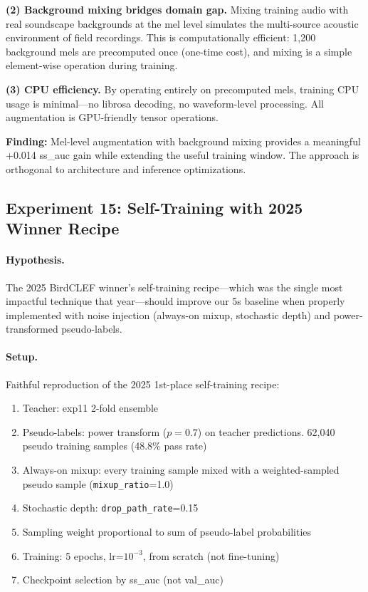\textbf{(2) Background mixing bridges domain gap.}
Mixing training audio with real soundscape backgrounds at the mel level
simulates the multi-source acoustic environment of field recordings. This
is computationally efficient: 1,200 background mels are precomputed once
(one-time cost), and mixing is a simple element-wise operation during training.

\textbf{(3) CPU efficiency.}
By operating entirely on precomputed mels, training CPU usage is minimal---no
librosa decoding, no waveform-level processing. All augmentation is GPU-friendly
tensor operations.

\textbf{Finding:} Mel-level augmentation with background mixing provides a
meaningful +0.014 ss\_auc gain while extending the useful training window.
The approach is orthogonal to architecture and inference optimizations.

\subsection{Experiment 15: Self-Training with 2025 Winner Recipe}
\label{sec:exp15}

\paragraph{Hypothesis.}
The 2025 BirdCLEF winner's self-training recipe---which was the single most
impactful technique that year---should improve our 5s baseline when properly
implemented with noise injection (always-on mixup, stochastic depth) and
power-transformed pseudo-labels.

\paragraph{Setup.}
Faithful reproduction of the 2025 1st-place self-training recipe:
\begin{enumerate}
    \item Teacher: exp11 2-fold ensemble
    \item Pseudo-labels: power transform ($p=0.7$) on teacher predictions.
    62,040 pseudo training samples (48.8\% pass rate)
    \item Always-on mixup: every training sample mixed with a weighted-sampled
    pseudo sample (\texttt{mixup\_ratio}=1.0)
    \item Stochastic depth: \texttt{drop\_path\_rate}=0.15
    \item Sampling weight proportional to sum of pseudo-label probabilities
    \item Training: 5 epochs, lr=$10^{-3}$, from scratch (not fine-tuning)
    \item Checkpoint selection by ss\_auc (not val\_auc)
\end{enumerate}

